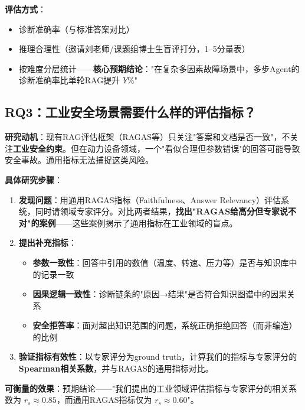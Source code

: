 \documentclass[a4paper, 11pt]{ctexart}
\begin{document}
\textbf{评估方式}：
\begin{itemize}
    \item 诊断准确率（与标准答案对比）
    \item 推理合理性（邀请刘老师/课题组博士生盲评打分，1--5分量表）
    \item 按难度分层统计——\textbf{核心预期结论}："在复杂多因素故障场景中，多步Agent的诊断准确率比单轮RAG提升 $Y\%$"
\end{itemize}



\subsection{RQ3：工业安全场景需要什么样的评估指标？}

\textbf{研究动机}：现有RAG评估框架（RAGAS等）只关注"答案和文档是否一致"，不关注\textbf{工业安全约束}。但在动力设备领域，一个"看似合理但参数错误"的回答可能导致安全事故。通用指标无法捕捉这类风险。

\textbf{具体研究步骤}：

\begin{enumerate}
    \item \textbf{发现问题}：用通用RAGAS指标（Faithfulness、Answer Relevancy）评估系统，同时请领域专家评分。对比两者结果，\textbf{找出"RAGAS给高分但专家说不对"的案例}——这些案例揭示了通用指标在工业领域的盲点。
    
    \item \textbf{提出补充指标}：
    \begin{itemize}
        \item \textbf{参数一致性}：回答中引用的数值（温度、转速、压力等）是否与知识库中的记录一致
        \item \textbf{因果逻辑一致性}：诊断链条的"原因→结果"是否符合知识图谱中的因果关系
        \item \textbf{安全拒答率}：面对超出知识范围的问题，系统正确拒绝回答（而非编造）的比例
    \end{itemize}
    
    \item \textbf{验证指标有效性}：以专家评分为ground truth，计算我们的指标与专家评分的\textbf{Spearman相关系数}，并与RAGAS的通用指标对比。
\end{enumerate}

\textbf{可衡量的效果}：预期结论——"我们提出的工业领域评估指标与专家评分的相关系数为 $r_s \approx 0.85$，而通用RAGAS指标仅为 $r_s \approx 0.60$"。


\end{document}
